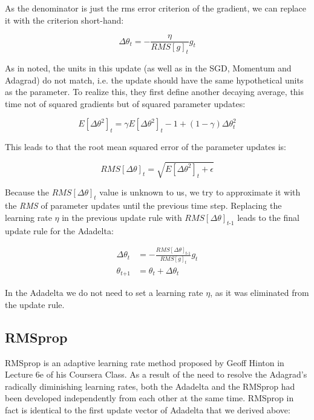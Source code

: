 \documentclass[12pt,oneside,a4paper,parskip]{scrbook}
\begin{document}
As the denominator is just the \ac{rms} error criterion of the gradient, we can replace
it with the criterion short-hand: 

\begin{equation}
  \Delta\theta_\textit{t} = -\frac{\eta}{RMS[\textit{g}]_t} \textit{g}_\textit{t}
\end{equation}

As in \cite{AdadeltaAddition} noted, the units in this update (as well as in the SGD, Momentum and Adagrad) do not match,
i.e. the update should have the same hypothetical units as the parameter. To realize this, they first define another 
decaying average, this time not of squared gradients but of squared parameter updates:

\begin{equation}
  \textit{E}[\Delta\theta^2]_t = \gamma\textit{E}[\Delta\theta^2]_t-1 + (1-\gamma)\Delta\theta^2_t
  \label{equ:adadelta_4}
\end{equation}

This leads to that the root mean squared error of the parameter updates is:

\begin{equation}
  \textit{RMS}[\Delta\theta]_t = \sqrt{\textit{E}[\Delta\theta^2]_t + \epsilon}
\end{equation}

Because the $\textit{RMS}[\Delta\theta]_t$ value is unknown to us, we try to approximate it with the \textit{RMS} of 
parameter updates until the previous time step. Replacing the learning rate $\eta$ in the previous update rule with $\textit{RMS}[\Delta\theta]_\textit{t-1}$
leads to the final update rule for the Adadelta:

\begin{equation}
  \begin{split}
  \Delta\theta_t &= - \frac{\textit{RMS}[\Delta\theta]_\textit{t-1}}{RMS[\textit{g}]_t} \textit{g}_\textit{t} \\
  \theta_\textit{t+1} &= \theta_t + \Delta\theta_t
  \end{split}
  \label{equ:adadelta_2}
\end{equation}

In the Adadelta we do not need to set a learning rate $\eta$, as it was eliminated from the update rule. \cite{overvieDiffRSLVQ}

\subsection{RMSprop}
RMSprop is an adaptive learning rate method proposed by Geoff Hinton in Lecture 6e of his Coursera Class. \cite{RMSprop_Hinton}
As a result of the need to resolve the Adagrad's radically diminishing learning rates, both the Adadelta and 
the RMSprop had been developed independently from each other at the same time. RMSprop in fact is identical
to the first update vector of Adadelta that we derived above:
\end{document}
